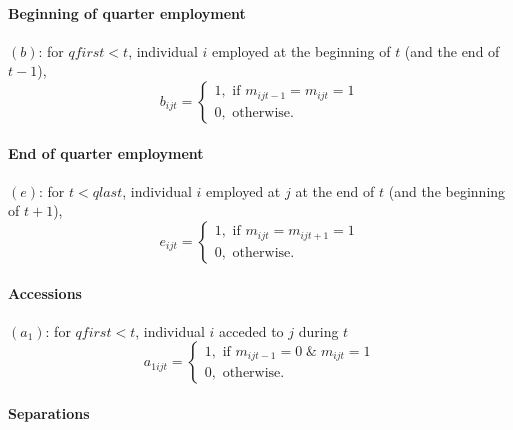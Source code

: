 \paragraph{Beginning of quarter employment}


$\left( b\right) $: for $qfirst<t$, individual $i$ employed at the beginning
of $t$ (and the end of $t-1$), 
\begin{equation}
b_{ijt}=\left\{ 
\begin{array}{l}
1,\text{ if }m_{ijt-1}=m_{ijt}=1 \\ 
0,\text{ otherwise.}%
\end{array}%
\right.  \label{eq:bijt}
\end{equation}

\paragraph{End of quarter employment}


$\left( e\right) $: for $t<qlast$, individual $i$ employed at $j$ at the end
of $t$ (and the beginning of $t+1$),%
\begin{equation}
e_{ijt}=\left\{ 
\begin{array}{l}
1,\text{ if }m_{ijt}=m_{ijt+1}=1 \\ 
0,\text{ otherwise.}%
\end{array}%
\right.  \label{eq:eijt}
\end{equation}

\paragraph{Accessions}


$\left( a_{1}\right) $: for $qfirst<t$, individual $i$ acceded to $j$ during 
$t$%
\begin{equation}
a_{1ijt}=\left\{ 
\begin{array}{l}
1,\text{ if }m_{ijt-1}=0\;\&\;m_{ijt}=1 \\ 
0,\text{ otherwise.}%
\end{array}%
\right.  \label{eq:a1ijt}
\end{equation}

\paragraph{Separations}

